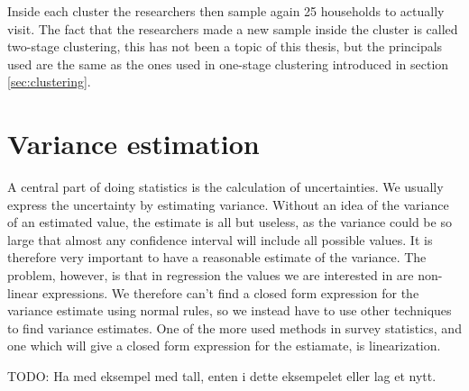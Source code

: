 \documentclass{article}
\begin{document}
Inside each cluster the researchers then sample again 25 households to actually
visit. The fact that the researchers made a new sample inside the cluster is
called two-stage clustering, this has not been a topic of this thesis, but the
principals used are the same as the ones used in one-stage clustering introduced
in section \ref{sec:clustering}.

\section{Variance estimation} \label{sec:VarEst}

A central part of doing statistics is the calculation of uncertainties. We
usually express the uncertainty by estimating variance. Without an idea of the
variance of an estimated value, the estimate is all but useless, as the variance
could be so large that almost any confidence interval will include all possible
values. It is therefore very important to have a reasonable estimate of the
variance. The problem, however, is that in regression the values we are
interested in are non-linear expressions. We therefore can't find a closed form
expression for the variance estimate using normal rules, so we instead have to
use other techniques to
find variance estimates. One of the more used methods in survey
statistics, and one which will give a closed form expression for the estiamate,
is linearization.

TODO: Ha med eksempel med tall, enten i dette eksempelet eller lag et nytt.
\end{document}
